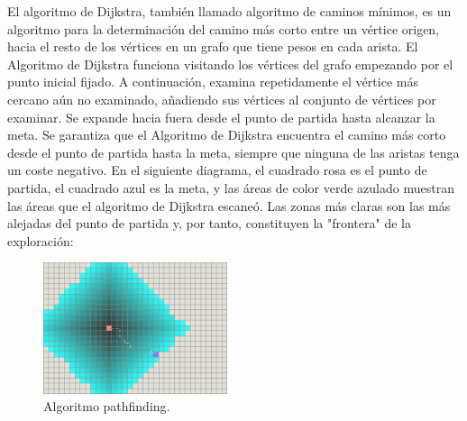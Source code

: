\documentclass[reprint,amsmath,amssymb,aps]{revtex4-2}
\begin{document}

% 

El algoritmo de Dijkstra, también llamado algoritmo de caminos mínimos, es un algoritmo para la determinación del camino más corto entre un vértice origen, hacia el resto de los vértices en un grafo que tiene pesos en cada arista. El Algoritmo de Dijkstra funciona visitando los vértices del grafo empezando por el punto inicial fijado. A continuación, examina repetidamente el vértice más cercano aún no examinado, añadiendo sus vértices al conjunto de vértices por examinar. Se expande hacia fuera desde el punto de partida hasta alcanzar la meta. Se garantiza que el Algoritmo de Dijkstra encuentra el camino más corto desde el punto de partida hasta la meta, siempre que ninguna de las aristas tenga un coste negativo. En el siguiente diagrama, el cuadrado rosa es el punto de partida, el cuadrado azul es la meta, y las áreas de color verde azulado muestran las áreas que el algoritmo de Dijkstra escaneó. Las zonas más claras son las más alejadas del punto de partida y, por tanto, constituyen la "frontera" de la exploración:

\begin{figure}[H]
 	\centering
 	\includegraphics[width=0.48\textwidth]{dijkstra.png}
 	\caption{Algoritmo pathfinding.}
 	\label{dijkstra}
\end{figure}
\end{document}
